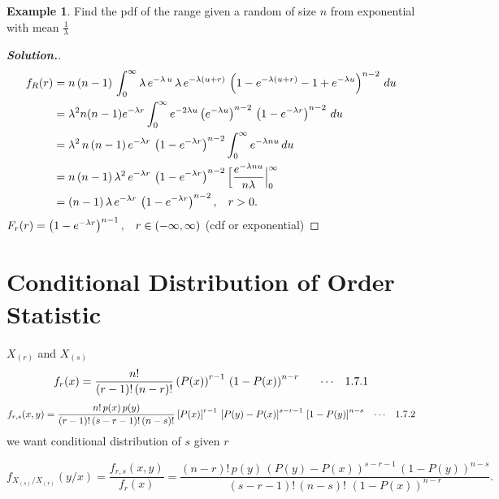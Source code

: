 \documentclass[12pt,a4paper]{report}
\theoremstyle{definition}
\newtheorem{exa}[thm]{Example}
\theoremstyle{plain}
\begin{document}
\begin{exa}
Find the pdf of the range given a random of size $n$ from exponential with mean $\frac{1}{\lambda}$
\end{exa}
\begin{proof}[\textbf{Solution.}]
\begin{align*}
f_R(r) & = n\, (n - 1)\, \int_{0}^{\infty}\lambda\, e^{-\lambda \, u}\, \lambda\, e^{-\lambda (u + r)}\, \left(1 - e^{-\lambda(u + r)} - 1 + e^{-\lambda u}\right)^{n - 2}\, du\\
&  = \lambda^2 n (n-1) e^{-\lambda r}\int_0^{\infty}e^{-2\lambda u}\left(e^{-\lambda u}\right)^{n - 2}\, \left(1  - e^{-\lambda r}\right)^{n - 2}\, du\\
& = \lambda^2\, n\, (n - 1)\, e^{-\lambda r}\, \left(1 - e^{-\lambda r}\right)^{n - 2}\int^{\infty}_0e^{-\lambda n u}\, du\\
& = n\, (n - 1)\, \lambda^2\, e^{-\lambda r}\, \left(1 - e^{-\lambda r}\right)^{n - 2}\Big[\frac{e^{-\lambda n u}}{n\lambda}\Big|_0^{\infty}\\
& = (n - 1)\, \lambda\, e^{-\lambda r}\, \left(1 - e^{-\lambda r}\right)^{n - 2}, \hspace{0.3cm} r >0.
\end{align*}
$F_r(r) = \left(1 - e^{-\lambda r}\right)^{n - 1}, \hspace{0.3cm} r \in (-\infty, \infty)$ (cdf or exponential)
\end{proof}






\section{Conditional Distribution of Order Statistic}
$X_{(r)}$ and $X_{(s)}$
$$f_r(x) = \frac{n!}{(r -1)!\, (n - r)!}\left(P(x)\right)^{r - 1}\, \left(1  - P(x)\right)^{n  - r}\hspace{0.6cm}\cdots\hspace{0.3cm}1.7.1$$
$$f_{r,s}(x,y)  = \frac{n!\, p(x)\, p(y)}{(r - 1)!\, (s  - r - 1)!\, (n - s)!}\left[P(x)\right]^{r - 1}\, \left[P(y) - P(x)\right]^{s - r - 1}\, \left[1 - P(y)\right]^{n - s}\hspace{0.3cm}\cdots\hspace{0.3cm}1.7.2$$
we want conditional distribution of $s$ given $r$

$$f_{X_{(s)}/X_{(r)}}(y/x) = \frac{f_{r,s}(x,y)}{f_r(x)}
 = \frac{(n - r)!\, p(y)\, \left(P(y) - P(x)\right)^{s - r - 1}\, \left(1 - P(y)\right)^{n - s}}{(s - r - 1)!\, (n - s)!\, \, \left(1 - P(x)\right)^{n - r}}.$$
\end{document}

